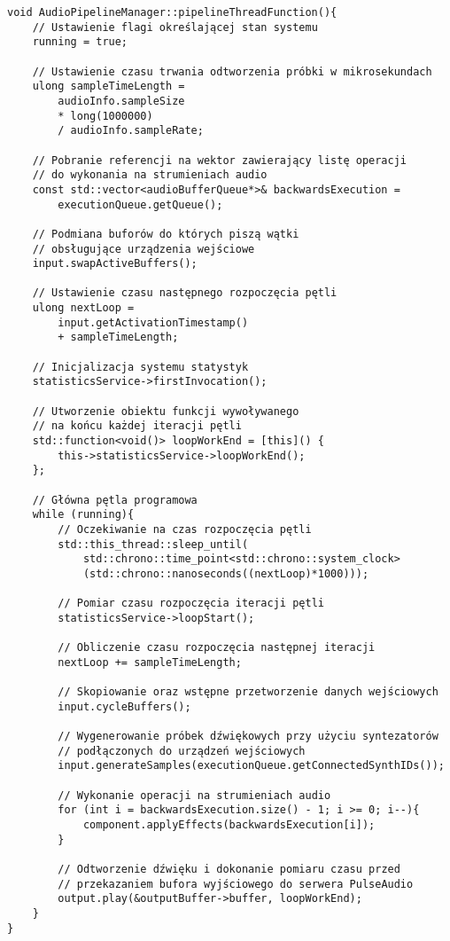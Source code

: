 {}
\begin{lstlisting}
void AudioPipelineManager::pipelineThreadFunction(){
    // Ustawienie flagi określającej stan systemu
    running = true;

    // Ustawienie czasu trwania odtworzenia próbki w mikrosekundach
    ulong sampleTimeLength = 
        audioInfo.sampleSize
        * long(1000000)
        / audioInfo.sampleRate;

    // Pobranie referencji na wektor zawierający listę operacji
    // do wykonania na strumieniach audio
    const std::vector<audioBufferQueue*>& backwardsExecution = 
        executionQueue.getQueue();

    // Podmiana buforów do których piszą wątki
    // obsługujące urządzenia wejściowe
    input.swapActiveBuffers();

    // Ustawienie czasu następnego rozpoczęcia pętli
    ulong nextLoop = 
        input.getActivationTimestamp() 
        + sampleTimeLength;

    // Inicjalizacja systemu statystyk
    statisticsService->firstInvocation();

    // Utworzenie obiektu funkcji wywoływanego
    // na końcu każdej iteracji pętli
    std::function<void()> loopWorkEnd = [this]() { 
        this->statisticsService->loopWorkEnd(); 
    };

    // Główna pętla programowa
    while (running){
        // Oczekiwanie na czas rozpoczęcia pętli
        std::this_thread::sleep_until(
            std::chrono::time_point<std::chrono::system_clock>
            (std::chrono::nanoseconds((nextLoop)*1000)));

        // Pomiar czasu rozpoczęcia iteracji pętli
        statisticsService->loopStart();

        // Obliczenie czasu rozpoczęcia następnej iteracji
        nextLoop += sampleTimeLength;

        // Skopiowanie oraz wstępne przetworzenie danych wejściowych
        input.cycleBuffers();

        // Wygenerowanie próbek dźwiękowych przy użyciu syntezatorów
        // podłączonych do urządzeń wejściowych
        input.generateSamples(executionQueue.getConnectedSynthIDs());

        // Wykonanie operacji na strumieniach audio
        for (int i = backwardsExecution.size() - 1; i >= 0; i--){
            component.applyEffects(backwardsExecution[i]);
        }

        // Odtworzenie dźwięku i dokonanie pomiaru czasu przed
        // przekazaniem bufora wyjściowego do serwera PulseAudio
        output.play(&outputBuffer->buffer, loopWorkEnd);
    }
}
\end{lstlisting}

